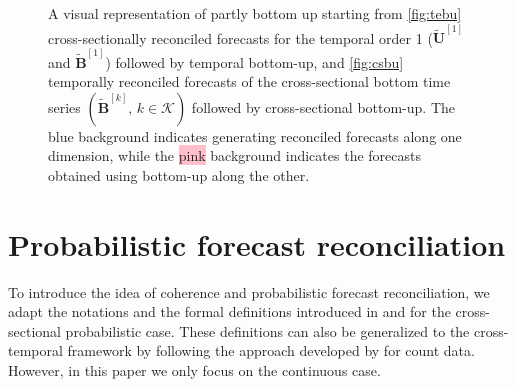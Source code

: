 \documentclass[12pt]{article}
\newcommand{\Bvet}{\bm{B}}
\newcommand{\Uvet}{\bm{U}}
\theoremstyle{definition}
\begin{document}
\begin{figure}[!hbt]
\begin{subfigure}[b]{0.49\textwidth}
{}
		\label{fig:csbu}
	\end{subfigure}
	\vspace{-0.5cm}
	\caption{A visual representation of partly bottom up starting from \eqref{fig:tebu} cross-sectionally reconciled forecasts for the temporal order 1 ($\widetilde{\Uvet}^{[1]}$ and $\widetilde{\Bvet}^{[1]}$) followed by temporal bottom-up, and \eqref{fig:csbu} temporally reconciled forecasts of the cross-sectional bottom time series $(\widetilde{\Bvet}^{[k]}, \, k\in \mathcal{K})$ followed by cross-sectional bottom-up. The \colorbox{mybluehl}{blue} background indicates generating reconciled forecasts along one dimension, while the \colorbox{pink}{pink} background indicates the forecasts obtained using bottom-up along the other.}
	\label{fig:bigBU}
\end{figure}

\section{Probabilistic forecast reconciliation}\label{sec:prob}

To introduce the idea of coherence and probabilistic forecast reconciliation, we adapt the notations and the formal definitions introduced in \cite{wickramasuriya2021b} and \cite{panagiotelis2023} for the cross-sectional probabilistic case. These definitions can also be generalized to the cross-temporal framework by following the approach developed by \cite{corani2022} for count data. However, in this paper we only focus on the continuous case.
\end{document}
